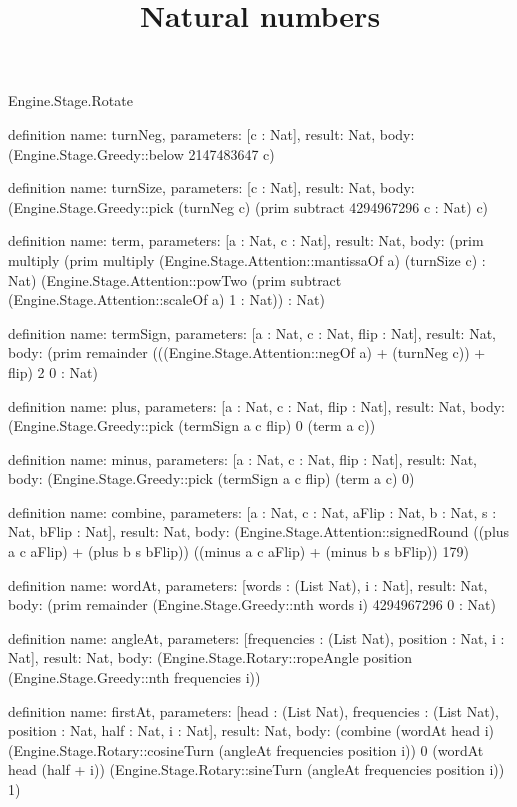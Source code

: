 \begin{lexlean}{Engine.Stage.Rotate}
\title{Natural numbers}
\begin{semanticmodule}
definition{
  name: turnNeg,
  parameters: [c : Nat],
  result: Nat,
  body: (Engine.Stage.Greedy::below 2147483647 c)
}

definition{
  name: turnSize,
  parameters: [c : Nat],
  result: Nat,
  body: (Engine.Stage.Greedy::pick (turnNeg c) (prim subtract 4294967296 c : Nat) c)
}

definition{
  name: term,
  parameters: [a : Nat, c : Nat],
  result: Nat,
  body: (prim multiply (prim multiply (Engine.Stage.Attention::mantissaOf a) (turnSize c) : Nat) (Engine.Stage.Attention::powTwo (prim subtract (Engine.Stage.Attention::scaleOf a) 1 : Nat)) : Nat)
}

definition{
  name: termSign,
  parameters: [a : Nat, c : Nat, flip : Nat],
  result: Nat,
  body: (prim remainder (((Engine.Stage.Attention::negOf a) + (turnNeg c)) + flip) 2 0 : Nat)
}

definition{
  name: plus,
  parameters: [a : Nat, c : Nat, flip : Nat],
  result: Nat,
  body: (Engine.Stage.Greedy::pick (termSign a c flip) 0 (term a c))
}

definition{
  name: minus,
  parameters: [a : Nat, c : Nat, flip : Nat],
  result: Nat,
  body: (Engine.Stage.Greedy::pick (termSign a c flip) (term a c) 0)
}

definition{
  name: combine,
  parameters: [a : Nat, c : Nat, aFlip : Nat, b : Nat, s : Nat, bFlip : Nat],
  result: Nat,
  body: (Engine.Stage.Attention::signedRound ((plus a c aFlip) + (plus b s bFlip)) ((minus a c aFlip) + (minus b s bFlip)) 179)
}

definition{
  name: wordAt,
  parameters: [words : (List Nat), i : Nat],
  result: Nat,
  body: (prim remainder (Engine.Stage.Greedy::nth words i) 4294967296 0 : Nat)
}

definition{
  name: angleAt,
  parameters: [frequencies : (List Nat), position : Nat, i : Nat],
  result: Nat,
  body: (Engine.Stage.Rotary::ropeAngle position (Engine.Stage.Greedy::nth frequencies i))
}

definition{
  name: firstAt,
  parameters: [head : (List Nat), frequencies : (List Nat), position : Nat, half : Nat, i : Nat],
  result: Nat,
  body: (combine (wordAt head i) (Engine.Stage.Rotary::cosineTurn (angleAt frequencies position i)) 0 (wordAt head (half + i)) (Engine.Stage.Rotary::sineTurn (angleAt frequencies position i)) 1)
}


\end{semanticmodule}
\end{lexlean}
